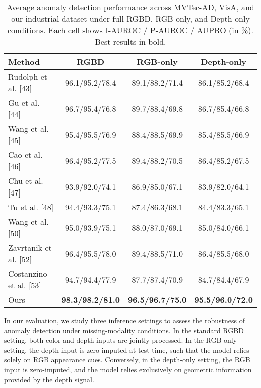 \documentclass[a4paper,fleqnn]{cas-sc}
\begin{document}
\begin{table}[ht]
\centering
\caption{Average anomaly detection performance across MVTec-AD, VisA, and our industrial dataset under full RGBD, RGB-only, and Depth-only conditions. Each cell shows I-AUROC / P-AUROC / AUPRO (in \%). Best results in bold.}
\label{tab:avg_missing_modality}
\begin{tabular}{lccc}
\toprule
Method & RGBD & RGB-only & Depth-only \\
\midrule
Rudolph et al. [43]  & 96.1/95.2/78.4 & 89.1/88.2/71.4 & 86.1/85.2/68.4 \\
Gu et al. [44]       & 96.7/95.4/76.8 & 89.7/88.4/69.8 & 86.7/85.4/66.8 \\
Wang et al. [45]     & 95.4/95.5/76.9 & 88.4/88.5/69.9 & 85.4/85.5/66.9 \\
Cao et al. [46]      & 96.4/95.2/77.5 & 89.4/88.2/70.5 & 86.4/85.2/67.5 \\
Chu et al. [47]      & 93.9/92.0/74.1 & 86.9/85.0/67.1 & 83.9/82.0/64.1 \\
Tu et al. [48]       & 94.4/93.3/75.1 & 87.4/86.3/68.1 & 84.4/83.3/65.1 \\
Wang et al. [50]     & 95.0/93.9/75.1 & 88.0/87.0/69.1 & 85.0/84.0/66.1 \\
Zavrtanik et al. [52]  & 96.4/95.5/78.0 & 89.4/88.5/71.0 & 86.4/85.5/68.0 \\
Costanzino et al. [53] & 94.7/94.4/77.9 & 87.7/87.4/70.9 & 84.7/84.4/67.9 \\
Ours                   & \textbf{98.3/98.2/81.0} & \textbf{96.5/96.7/75.0} & \textbf{95.5/96.0/72.0} \\
\bottomrule
\end{tabular}
\end{table}

\noindent
In our evaluation, we study three inference settings to assess the robustness of anomaly detection under missing-modality conditions. In the standard RGBD setting, both color and depth inputs are jointly processed. In the RGB-only setting, the depth input is zero-imputed at test time, such that the model relies solely on RGB appearance cues. Conversely, in the depth-only setting, the RGB input is zero-imputed, and the model relies exclusively on geometric information provided by the depth signal.
\end{document}
